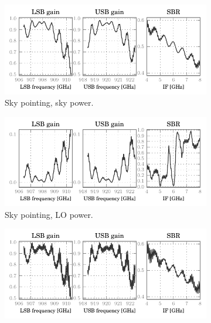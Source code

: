 \begin{figure}[p]
    \centering
    \begin{subfigure}[b]{\textwidth}
        \centering
        \includegraphics[scale=.9]{87_00_00_sky_s_lsbusbsbr}
        \vspace{-.8em}
        \caption{Sky pointing, sky power.}
    \end{subfigure}
    \begin{subfigure}[b]{\textwidth}
        \centering
        \includegraphics[scale=.9]{87_00_00_sky_l_lsbusbsbr}
        \vspace{-.8em}
        \caption{Sky pointing, LO power.}
    \end{subfigure}
    \begin{subfigure}[b]{\textwidth}
        \centering
        \includegraphics[scale=.9]{87_00_00_hbb_s_lsbusbsbr}

\end{subfigure}
\end{figure}
